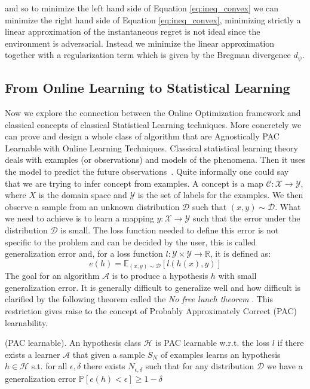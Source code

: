 and so to minimize the left hand side of Equation \eqref{eq:ineq_convex} we can minimize the right hand side of Equation \eqref{eq:ineq_convex}, minimizing strictly a linear approximation of the instantaneous regret is not ideal since the environment is adversarial. Instead we minimize the linear approximation together with a regularization term which is given by the Bregman divergence $d_\psi$.

\subsection{From Online Learning to Statistical Learning}
Now we explore the connection between the Online Optimization framework and classical concepts of classical Statistical Learning techniques. More concretely we can prove and design a whole class of algorithm that are Agnostically PAC Learnable with Online Learning Techniques.
Classical statistical learning theory deals with examples (or observations) and models of the phenomena. Then it uses the model to predict the future observations~\cite{bousquet2003introduction}. Quite informally one could say that we are trying to infer concept from examples. A concept is a map $\mathcal C:\mathcal X\to\mathcal Y$, where $X$ is the domain space and $\mathcal Y$ is the set of labels for the examples. We then observe a sample from an unknown distribution $\mathcal D$ such that $(x,y)\sim \mathcal D$. What we need to achieve is to learn a mapping $y:\mathcal X\to\mathcal Y$ such that the error under the distribution $\mathcal D$ is small. The loss function needed to define this error is not specific to the problem and can be decided by the user, this is called generalization error and, for a loss function $l:\mathcal Y\times\mathcal Y \to\mathbb R$, it is defined as:
\begin{equation}\label{eq:generalization}
    e(h) = \mathbb E_{(x,y)\sim \mathcal D}[l(h(x),y)]
\end{equation}
The goal for an algorithm $\mathcal A$ is to produce a hypothesis $h$ with small generalization error. 
It is generally difficult to generalize well and how difficult is clarified by the following theorem called the \emph{No free lunch theorem} \cite{mitchell1997machine}.
This restriction gives raise to the concept of Probably Approximately Correct (PAC) learnability. 

\begin{definition}(PAC learnable).\label{def:PAC}
    An hypothesis class $\mathcal H$ is PAC learnable w.r.t. the loss $l$ if there exists a learner $\mathcal A$ that given a sample $S_N$ of examples learns an hypothesis $h\in\mathcal H$ s.t. for all $\epsilon,\delta$ there exists $N_{\epsilon,\delta}$ such that for any distribution $\mathcal D$ we have a generalization error $\mathbb P[e(h)<\epsilon]\ge1-\delta$
\end{definition}

